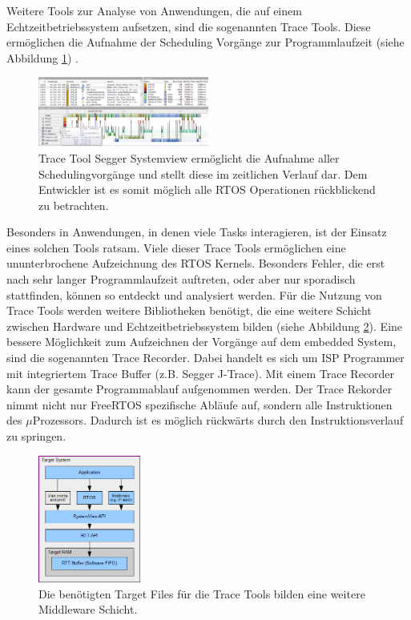 Weitere Tools zur Analyse von Anwendungen, die auf einem Echtzeitbetriebssystem aufsetzen, sind die sogenannten Trace Tools. Diese ermöglichen die Aufnahme der Scheduling Vorgänge zur Programmlaufzeit (siehe Abbildung \ref {fig:Systemview}) . 
\begin{figure}[hbt]
	\centering
		\includegraphics[width=0.5\textwidth]{Pictures/Segger/systemview.png}
	\caption{Trace Tool Segger Systemview ermöglicht die Aufnahme aller Schedulingvorgänge und stellt diese im zeitlichen Verlauf dar. Dem Entwickler ist es somit möglich alle RTOS Operationen rückblickend zu betrachten.}
	\label{fig:Systemview}
\end{figure}
Besonders in Anwendungen, in denen viele Tasks interagieren, ist der Einsatz eines solchen Tools ratsam. Viele dieser Trace Tools ermöglichen eine ununterbrochene Aufzeichnung des RTOS Kernels. Besonders Fehler, die erst nach sehr langer Programmlaufzeit auftreten, oder aber nur sporadisch stattfinden, können so entdeckt und analysiert werden. Für die Nutzung von Trace Tools werden weitere Bibliotheken benötigt, die eine weitere Schicht zwischen Hardware und Echtzeitbetriebssystem bilden (siehe Abbildung \ref{fig:SystemviewTarget}). Eine bessere Möglichkeit zum Aufzeichnen der Vorgänge auf dem embedded System, sind die sogenannten Trace Recorder. Dabei handelt es sich um ISP Programmer mit integriertem Trace Buffer (z.B. Segger J-Trace). Mit einem Trace Recorder kann der gesamte Programmablauf aufgenommen werden. Der Trace Rekorder nimmt nicht nur FreeRTOS spezifische Abläufe auf, sondern alle Instruktionen des $\mu$Prozessors. Dadurch ist es möglich rückwärts durch den Instruktionsverlauf zu springen.
\begin{figure}[hbt]
	\centering
		\includegraphics[width=0.3\textwidth]{Pictures/Segger/SystemViewTarget.png}
	\caption{Die benötigten Target Files für die Trace Tools bilden eine weitere Middleware Schicht.}
	\label{fig:SystemviewTarget}
\end{figure}
